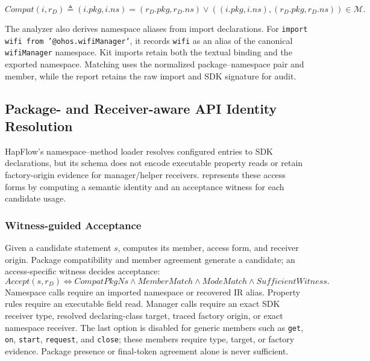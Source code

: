 \begin{equation}
Compat(i,r_D) \triangleq
(i.pkg,i.ns)=(r_D.pkg,r_D.ns)
\lor ((i.pkg,i.ns),(r_D.pkg,r_D.ns))\in\mathcal{M}.
\end{equation}

The analyzer also derives namespace aliases from import declarations. For \texttt{import wifi from '@ohos.wifiManager'}, it records \texttt{wifi} as an alias of the canonical \texttt{wifiManager} namespace. Kit imports retain both the textual binding and the exported namespace. Matching uses the normalized package--namespace pair and member, while the report retains the raw import and SDK signature for audit.

\subsection{Package- and Receiver-aware API Identity Resolution}
\label{subsec:identity_resolution}

HapFlow's namespace--method loader resolves configured entries to SDK declarations, but its schema does not encode executable property reads or retain factory-origin evidence for manager/helper receivers. \mytool represents these access forms by computing a semantic identity and an acceptance witness for each candidate usage.

\subsubsection{Witness-guided Acceptance}

Given a candidate statement $s$, \mytool computes its member, access form, and receiver origin. Package compatibility and member agreement generate a candidate; an access-specific witness decides acceptance:
\begin{equation}
\mathit{Accept}(s,r_D) \iff
\mathit{CompatPkgNs}\land\mathit{MemberMatch}\land
\mathit{ModeMatch}\land\mathit{SufficientWitness}.
\end{equation}
Namespace calls require an imported namespace or recovered IR alias. Property rules require an executable field read. Manager calls require an exact SDK receiver type, resolved declaring-class target, traced factory origin, or exact namespace receiver. The last option is disabled for generic members such as \texttt{get}, \texttt{on}, \texttt{start}, \texttt{request}, and \texttt{close}; these members require type, target, or factory evidence. Package presence or final-token agreement alone is never sufficient.


